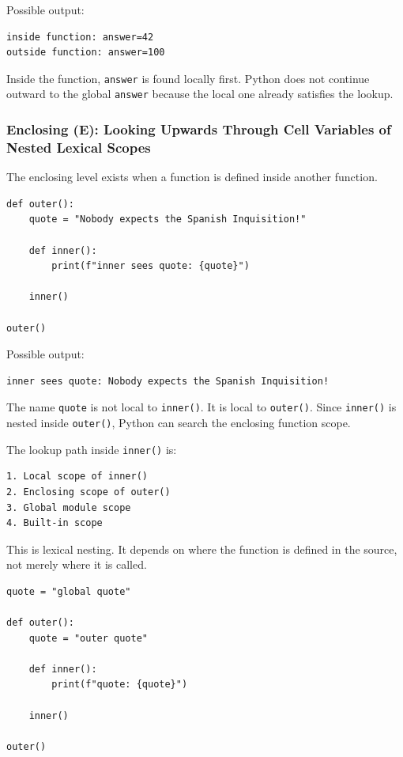 Possible output:

\begin{verbatim}
inside function: answer=42
outside function: answer=100
\end{verbatim}

Inside the function, \texttt{answer} is found locally first. Python does not continue outward to the global \texttt{answer} because the local one already satisfies the lookup.

\subsubsection{Enclosing (E): Looking Upwards Through Cell Variables of Nested Lexical Scopes}

The enclosing level exists when a function is defined inside another function.

\begin{verbatim}
def outer():
    quote = "Nobody expects the Spanish Inquisition!"

    def inner():
        print(f"inner sees quote: {quote}")

    inner()

outer()
\end{verbatim}

Possible output:

\begin{verbatim}
inner sees quote: Nobody expects the Spanish Inquisition!
\end{verbatim}

The name \texttt{quote} is not local to \texttt{inner()}. It is local to \texttt{outer()}. Since \texttt{inner()} is nested inside \texttt{outer()}, Python can search the enclosing function scope.

The lookup path inside \texttt{inner()} is:

\begin{verbatim}
1. Local scope of inner()
2. Enclosing scope of outer()
3. Global module scope
4. Built-in scope
\end{verbatim}

This is lexical nesting. It depends on where the function is defined in the source, not merely where it is called.

\begin{verbatim}
quote = "global quote"

def outer():
    quote = "outer quote"

    def inner():
        print(f"quote: {quote}")

    inner()

outer()
\end{verbatim}

